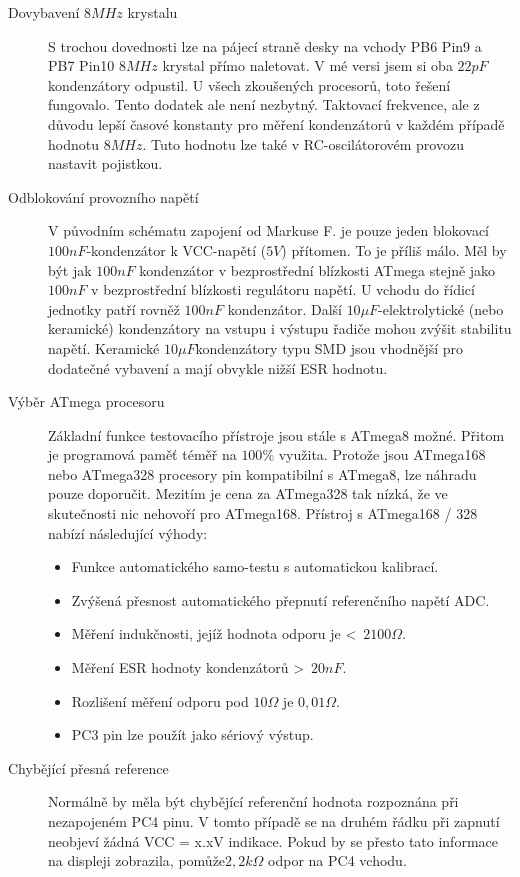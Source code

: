\begin{description}
\item[Dovybavení \(8MHz\) krystalu] S trochou dovednosti lze na pájecí straně desky na vchody PB6 Pin9 a PB7
Pin10  \(8MHz\) krystal přímo naletovat.
V mé versi jsem si oba \(22pF\) kondenzátory odpustil.
U všech zkoušených procesorů, toto řešení fungovalo.
Tento dodatek ale není nezbytný.
Taktovací frekvence, ale z důvodu lepší časové konstanty pro měření kondenzátorů v každém případě
hodnotu \(8MHz\).
Tuto hodnotu lze také v RC-oscilátorovém provozu nastavit pojistkou.

\item[Odblokování provozního napětí]
V původním schématu zapojení od Markuse F. je pouze jeden blokovací \(100nF\)-kondenzátor
k VCC-napětí (\(5V\)) přítomen. To je příliš málo. Měl by být jak \(100nF\) kondenzátor v bezprostřední
blízkosti ATmega stejně jako \(100nF\) v bezprostřední blízkosti regulátoru napětí. U vchodu do 
řídicí jednotky patří rovněž  \(100nF\) kondenzátor. Další  \(10\mu F\)-elektrolytické (nebo keramické)
kondenzátory na vstupu i výstupu řadiče mohou zvýšit stabilitu napětí.
Keramické \(10\mu F\)kondenzátory typu SMD jsou vhodnější pro dodatečné vybavení a mají
obvykle nižší ESR hodnotu.

\item[Výběr ATmega procesoru]
Základní funkce testovacího přístroje jsou stále s ATmega8 možné.
Přitom je programová paměť téměř na  \(100\%\) využita.
Protože jsou ATmega168 nebo ATmega328 procesory pin kompatibilní s ATmega8,
lze náhradu pouze doporučit. Mezitím  je cena za ATmega328 tak nízká, že ve skutečnosti nic
nehovoří pro ATmega168.
Přístroj s ATmega168 / 328 nabízí následující výhody:
\begin{itemize} \setlength{\itemsep}{-0.4em}
\item Funkce automatického samo-testu s automatickou kalibrací.
\item Zvýšená přesnost automatického přepnutí referenčního napětí ADC.
\item Měření indukčnosti, jejíž hodnota odporu je  \textless~\(2100\Omega\).
\item Měření ESR hodnoty kondenzátorů \textgreater~\(20nF\).
\item Rozlišení měření odporu pod \(10\Omega\) je \(0,01\Omega\).
\item PC3 pin lze použít jako sériový výstup.
\end{itemize}

\item[Chybějící přesná reference]
Normálně by měla být chybějící referenční hodnota rozpoznána při nezapojeném PC4 pinu.
V tomto případě se na druhém řádku při zapnutí neobjeví žádná VCC = x.xV indikace.
Pokud by se přesto tato informace na displeji zobrazila, pomůže\(2,2k\Omega\) odpor na PC4 vchodu.
\end{description}

